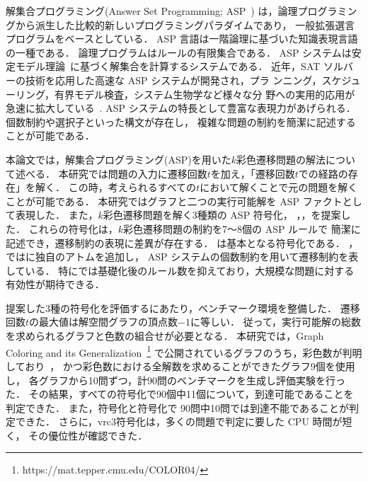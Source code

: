 解集合プログラミング(Answer Set Programming; ASP~\cite{%
Baral03:cambridge,%
Gelfond88:iclp,%
Inoue08:jssst,%
Niemela99:amai})
は，論理プログラミングから派生した比較的新しいプログラミングパラダイムであり，
一般拡張選言プログラムをベースとしている．
ASP 言語は一階論理に基づいた知識表現言語の一種である．
論理プログラムはルールの有限集合である．
ASP システムは安定モデル理論~\cite{Gelfond88:iclp}に基づく解集合を計算するシステムである．
近年，SAT ソルバーの技術を応用した高速な ASP システムが開発され，プラ
ンニング，スケジューリング，有界モデル検査，システム生物学など様々な分
野への実用的応用が急速に拡大している~\cite{Erdem16:AI}.
ASP システムの特長として豊富な表現力があげられる．
個数制約や選択子といった構文が存在し，
複雑な問題の制約を簡潔に記述することが可能である．

本論文では，解集合プログラミング(ASP)を用いた$k$彩色遷移問題の解法について述べる．
本研究では問題の入力に遷移回数$t$を加え，「遷移回数$t$での経路の存在」を解く．
この時，考えられるすべての$t$において解くことで元の問題を解くことが可能である．
本研究ではグラフと二つの実行可能解を ASP ファクトとして表現した．
また，$k$彩色遷移問題を解く3種類の ASP 符号化，
，，を提案した．
これらの符号化は，$k$彩色遷移問題の制約を7〜8個の ASP ルールで
簡潔に記述でき，遷移制約の表現に差異が存在する．
は基本となる符号化である．
，ではに独自のアトムを追加し，
ASP システムの個数制約を用いて遷移制約を表している．
特にでは基礎化後のルール数を抑えており，大規模な問題に対する有効性が期待できる．

提案した3種の符号化を評価するにあたり，ベンチマーク環境を整備した．
遷移回数$t$の最大値は解空間グラフの頂点数$-1$に等しい．
従って，実行可能解の総数を求められるグラフと色数の組合せが必要となる．
本研究では，Graph Coloring and its Generalization~\footnote{https://mat.tepper.cmu.edu/COLOR04/}
で公開されているグラフのうち，彩色数が判明しており~\cite{DBLP:journals/constraints/TamuraTKB09}，
かつ彩色数における全解数を求めることができたグラフ9個を使用し，
各グラフから10問ずつ，計90問のベンチマークを生成し評価実験を行った．
その結果，すべての符号化で90個中11個について，到達可能であることを判定できた．
また，符号化と符号化で
90問中10問では到達不能であることが判定できた．
さらに，\textsf{vrc3}符号化は，多くの問題で判定に要した CPU 時間が短く，
その優位性が確認できた．

